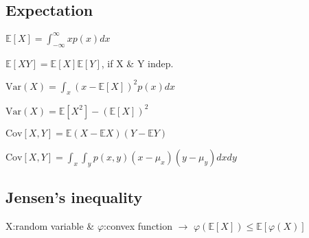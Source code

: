 \subsection*{Expectation}
\begin{compactdesc}
	\item $\mathbb{E}[X] = \int_{-\infty}^{\infty} x p(x) dx$
	\item $\mathbb{E}[XY] = \mathbb{E}[X]  \mathbb{E}[Y]$, if X \& Y indep.
	\item $\text{Var}(X) = \int_x (x-\mathbb{E}[X])^2 p(x) dx$
	\item $\text{Var}(X) = \mathbb{E}[X^2]-(\mathbb{E}[X])^2$ 
	\item $\text{Cov}[X, Y] = \mathbb{E}(X-\mathbb{E}X)(Y-\mathbb{E}Y)$
	\item $\text{Cov}[X, Y] = \int_x \int_y p(x,y) (x-\mu_x)(y-\mu_y) dx dy$
\end{compactdesc}
\subsection*{Jensen's inequality}
	X:random variable \& $\varphi$:convex function $\rightarrow$ $\varphi(\mathbb{E}[X]) \leq \mathbb{E}[\varphi(X)]$


